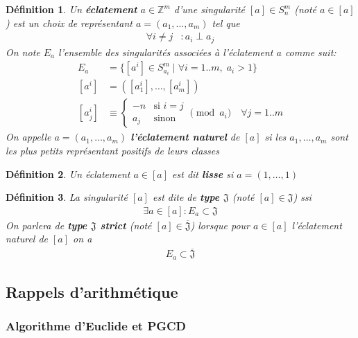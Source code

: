 \documentclass{article}
\newtheorem{definition}{Définition}
\newcommand{\J}{\mathfrak{J}}
\newcommand{\JS}{\overline{\J}}
\begin{document}
\begin{definition}
    Un \textbf{éclatement} $a \in \mathbb{Z}^m$ d'une singularité $[a] \in S_n^m$ (noté $a \in [a]$) est un choix de 
    représentant $a = (a_1, \dots, a_m)$ tel que
    \begin{align*}
        \forall i \neq j & : a_i \perp a_j
    \end{align*}
    On note $E_a$ l'ensemble des singularités associées à l'éclatement $a$ comme suit:
    \begin{align*}
        E_a & = \{ [a^i] \in S_{a_i}^m \mid \forall i = 1..m,\; a_i > 1 \} \\
        [a^i] & = ([a^i_1], \dots, [a^i_m]) \\
        [a^i_j] & \equiv \begin{cases}
            -n & \text{si $i = j$} \\
            a_j & \text{sinon}
        \end{cases} \pmod{a_i} \quad \forall j = 1..m
    \end{align*}
    On appelle $a = (a_1, \dots, a_m)$ \textbf{l'éclatement naturel} de $[a]$ si 
    les $a_1, \dots, a_m$ sont les plus petits représentant positifs de leurs classes
\end{definition}

\begin{definition}
    Un éclatement $a \in [a]$ est dit \textbf{lisse} si $a = (1, \dots, 1)$
\end{definition}

\begin{definition}
    La singularité $[a]$ est dite de \textbf{type $\J$} (noté $[a] \in \J$) ssi
    \begin{align*}
        \exists a \in [a] : E_a \subset \J
    \end{align*}
    On parlera de \textbf{type $\J$ strict} (noté $[a] \in \JS$) lorsque 
    pour $a \in [a]$ l'éclatement naturel de $[a]$ on a
    \begin{align*}
        E_a \subset \JS
    \end{align*}
\end{definition}

\newpage

\subsection{Rappels d'arithmétique}

\subsubsection{Algorithme d'Euclide et PGCD}
\end{document}
